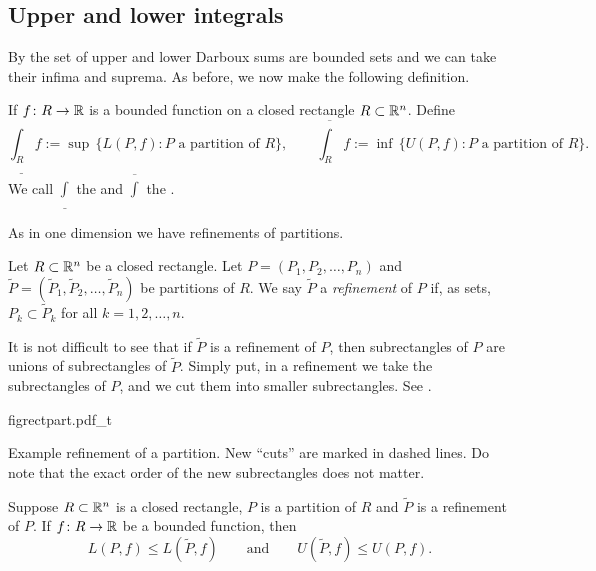 \subsection{Upper and lower integrals}

By  the set of upper and lower Darboux sums are bounded sets and we can take
their infima and suprema.  As before, we now make the following definition.

\begin{defn}
If $f \colon R \to {\mathbb{R}}$ is a bounded function on a closed rectangle $R \subset
{\mathbb{R}}^n$.
Define
\begin{equation*}
\underline{\int_R} f
:= \sup \, \bigl\{ L(P,f) : P \text{ a partition of $R$} \bigr\} , 
\qquad
\overline{\int_R} f
:= \inf \, \bigl\{ U(P,f) : P \text{ a partition of $R$} \bigr\} .
\end{equation*}
We call $\underline{\int}$ the
\emph{} and
$\overline{\int}$ the \emph{}.
\end{defn}

As in one dimension we have refinements of partitions.

\begin{defn}
Let $R \subset {\mathbb{R}}^n$ be a closed rectangle.
Let $P = ( P_1, P_2, \ldots, P_n )$
and $\widetilde{P} = ( \widetilde{P}_1, \widetilde{P}_2, \ldots, \widetilde{P}_n )$
be partitions of $R$.  We say $\widetilde{P}$ a
\emph{refinement} of $P$
if, as sets, $P_k \subset \widetilde{P}_k$ for all $k = 1,2,\ldots,n$.
\end{defn}

It is not difficult to see that if $\widetilde{P}$ is a refinement of $P$,
then subrectangles of $P$ are unions of subrectangles of $\widetilde{P}$.
Simply put, in a refinement we take the subrectangles of $P$,
and we cut them into smaller subrectangles.  See .

\begin{myfigureht}
{figrectpart.pdf_t}
\caption{Example refinement of a partition.  New ``cuts'' are marked in
dashed lines.  Do note that the exact order of the new subrectangles does not
matter.\label{mv:figrectpart}}
\end{myfigureht}

\begin{prop} \label{mv:prop:refinement}
Suppose $R \subset {\mathbb{R}}^n$ is a closed rectangle, $P$ is a partition of $R$
and $\widetilde{P}$ is a refinement of $P$.
If $f \colon R \to {\mathbb{R}}$ be a bounded function,
then
\begin{equation*}
L(P,f) \leq L(\widetilde{P},f) 
\qquad \text{and} \qquad
U(\widetilde{P},f) \leq U(P,f) .
\end{equation*}
\end{prop}

